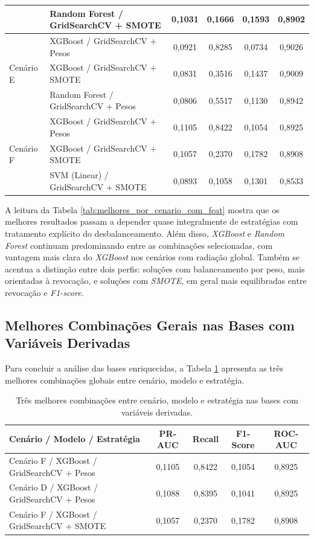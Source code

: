 \begin{table}[ht]
\begin{tabular}{llcccc}
& Random Forest / GridSearchCV + SMOTE & 0,1031 & 0,1666 & 0,1593 & 0,8902 \\
\midrule
\multirow{3}{*}{Cenário E}
& XGBoost / GridSearchCV + Pesos & 0,0921 & 0,8285 & 0,0734 & 0,9026 \\
& XGBoost / GridSearchCV + SMOTE & 0,0831 & 0,3516 & 0,1437 & 0,9009 \\
& Random Forest / GridSearchCV + Pesos & 0,0806 & 0,5517 & 0,1130 & 0,8942 \\
\midrule
\multirow{3}{*}{Cenário F}
& XGBoost / GridSearchCV + Pesos & 0,1105 & 0,8422 & 0,1054 & 0,8925 \\
& XGBoost / GridSearchCV + SMOTE & 0,1057 & 0,2370 & 0,1782 & 0,8908 \\
& SVM (Linear) / GridSearchCV + SMOTE & 0,0893 & 0,1058 & 0,1301 & 0,8533 \\
\bottomrule
\end{tabular}
\end{table}

A leitura da Tabela \ref{tab:melhores_por_cenario_com_feat} mostra que os melhores resultados passam a depender quase integralmente de estratégias com tratamento explícito do desbalanceamento. Além disso, \textit{XGBoost} e \textit{Random Forest} continuam predominando entre as combinações selecionadas, com vantagem mais clara do \textit{XGBoost} nos cenários com radiação global. Também se acentua a distinção entre dois perfis: soluções com balanceamento por peso, mais orientadas à revocação, e soluções com \textit{SMOTE}, em geral mais equilibradas entre revocação e \textit{F1-score}.

\subsection{Melhores Combinações Gerais nas Bases com Variáveis Derivadas}
\label{subsec:top3_geral_com_feat}

Para concluir a análise das bases enriquecidas, a Tabela \ref{tab:top3_geral_com_feat} apresenta as três melhores combinações globais entre cenário, modelo e estratégia.

\begin{table}[ht]
\centering
\caption{Três melhores combinações entre cenário, modelo e estratégia nas bases com variáveis derivadas.}
\label{tab:top3_geral_com_feat}
\small
\begin{tabular}{lcccc}
\toprule
\textbf{Cenário / Modelo / Estratégia} & \textbf{PR-AUC} & \textbf{Recall} & \textbf{F1-Score} & \textbf{ROC-AUC} \\
\midrule
Cenário F / XGBoost / GridSearchCV + Pesos & 0,1105 & 0,8422 & 0,1054 & 0,8925 \\
Cenário D / XGBoost / GridSearchCV + Pesos & 0,1088 & 0,8395 & 0,1041 & 0,8925 \\
Cenário F / XGBoost / GridSearchCV + SMOTE & 0,1057 & 0,2370 & 0,1782 & 0,8908 \\
\bottomrule
\end{tabular}
\end{table}

